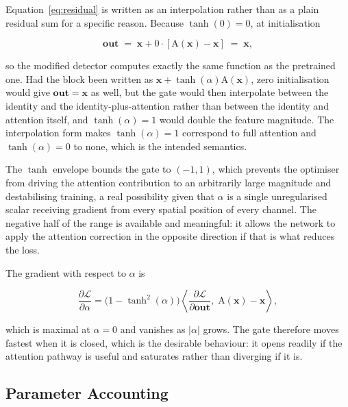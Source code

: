 \documentclass[MScCS]{uccthesis}
\begin{document}
Equation~\eqref{eq:residual} is written as an interpolation rather than as a
plain residual sum for a specific reason. Because $\tanh(0) = 0$, at
initialisation

\begin{equation}
   \mathbf{out} \;=\; \mathbf{x} + 0 \cdot
      \left[ \mathrm{A}(\mathbf{x}) - \mathbf{x} \right]
   \;=\; \mathbf{x},
\end{equation}

so the modified detector computes exactly the same function as the pretrained
one. Had the block been written as $\mathbf{x} + \tanh(\alpha)\mathrm{A}(\mathbf{x})$,
zero initialisation would give $\mathbf{out} = \mathbf{x}$ as well, but the
gate would then interpolate between the identity and the identity-plus-attention
rather than between the identity and attention itself, and $\tanh(\alpha) = 1$
would double the feature magnitude. The interpolation form makes
$\tanh(\alpha) = 1$ correspond to full attention and $\tanh(\alpha) = 0$ to
none, which is the intended semantics.

The $\tanh$ envelope bounds the gate to $(-1, 1)$, which prevents the optimiser
from driving the attention contribution to an arbitrarily large magnitude and
destabilising training, a real possibility given that $\alpha$ is a single
unregularised scalar receiving gradient from every spatial position of every
channel. The negative half of the range is available and meaningful: it allows
the network to apply the attention correction in the opposite direction if that
is what reduces the loss.

The gradient with respect to $\alpha$ is

\begin{equation}
   \frac{\partial \mathcal{L}}{\partial \alpha}
   = \bigl(1 - \tanh^{2}(\alpha)\bigr)
     \left\langle
        \frac{\partial \mathcal{L}}{\partial \mathbf{out}},\;
        \mathrm{A}(\mathbf{x}) - \mathbf{x}
     \right\rangle,
   \label{eq:alpha_grad}
\end{equation}

which is maximal at $\alpha = 0$ and vanishes as $|\alpha|$ grows. The gate
therefore moves fastest when it is closed, which is the desirable behaviour: it
opens readily if the attention pathway is useful and saturates rather than
diverging if it is.

\subsection{Parameter Accounting}
\end{document}
